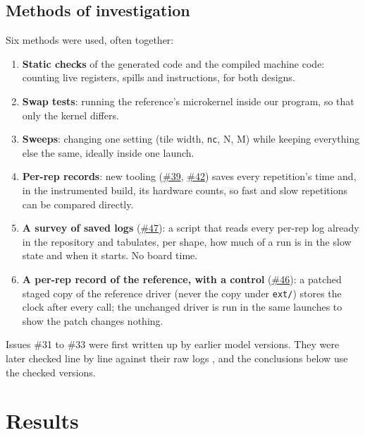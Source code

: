 \documentclass[11pt,a4paper]{article}
\newcommand{\iss}[1]{\href{https://github.com/JieGH/RVV_code_gen_via_MLIR_xDSL/issues/#1}{\##1}}
\begin{document}
\subsection{Methods of investigation}
Six methods were used, often together:
\begin{enumerate}
  \item \textbf{Static checks} of the generated code and the compiled machine code: counting live registers,
  spills and instructions, for both designs.
  \item \textbf{Swap tests}: running the reference's microkernel inside our program, so that only the kernel
  differs.
  \item \textbf{Sweeps}: changing one setting (tile width, \texttt{nc}, N, M) while keeping everything else the
  same, ideally inside one launch.
  \item \textbf{Per-rep records}: new tooling (\iss{39}, \iss{42}) saves every repetition's time and, in the
  instrumented build, its hardware counts, so fast and slow repetitions can be compared directly.
  \item \textbf{A survey of saved logs} (\iss{47}): a script that reads every per-rep log already in the repository
  and tabulates, per shape, how much of a run is in the slow state and when it starts. No board time.
  \item \textbf{A per-rep record of the reference, with a control} (\iss{46}): a patched staged copy of the
  reference driver (never the copy under \texttt{ext/}) stores the clock after every call; the unchanged driver is
  run in the same launches to show the patch changes nothing.
\end{enumerate}
Issues \#31 to \#33 were first written up by earlier model versions. They were later checked line by line
against their raw logs \cite{b3134}, and the conclusions below use the checked versions.

\section{Results}
\end{document}
